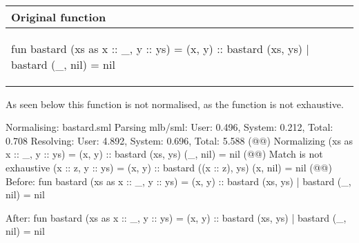 \begin{example}\
  \label{ex:eval-normal-example-bastard}\\

  \begin{center}  
  \begin{tabular}{|l|}
    \hline
    \textbf{Original function}
    \\ \hline
\begin{sml}
fun bastard (xs as x :: _, y :: ys) = (x, y) :: bastard (xs, ys)
  | bastard (_, nil) = nil    
\end{sml}
    \\\hline    
  \end{tabular}
  \end{center}

  As seen below this function is not normalised, as
  the  function is not exhaustive.

  \begin{narrow}{-3em}{0em}
    \setlength{\linewidth}{1.2\linewidth}
    \footnotesize
    
    \begin{multicols}{2}           
      \begin{sml}
Normalising: bastard.sml
Parsing mlb/sml: 
  User: 0.496, System: 0.212, Total: 0.708
Resolving: 
  User: 4.892, System: 0.696, Total: 5.588
(@@)
Normalizing
  (xs as x :: _, y :: ys) = (x, y) :: bastard (xs, ys)
  (_, nil) = nil
(@@)
Match is not exhaustive
  (x :: z, y :: ys) = (x, y) :: bastard ((x :: z), ys)
  (x, nil) = nil
(@@)
Before:
fun bastard (xs as x :: _, y :: ys) = (x, y) 
                                      :: bastard (xs, ys)
  | bastard (_, nil) = nil

After:
fun bastard (xs as x :: _, y :: ys) = (x, y) 
                                      :: bastard (xs, ys)
  | bastard (_, nil) = nil    
      \end{sml}
    \end{multicols}
  \end{narrow}
\end{example}



